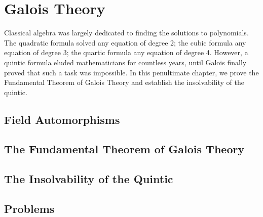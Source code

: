 \chapter{Galois Theory}
Classical algebra was largely dedicated to finding the solutions to polynomials. The quadratic formula solved any equation of degree 2; the cubic formula any equation of degree 3; the quartic formula any equation of degree 4. However, a quintic formula eluded mathematicians for countless years, until Galois finally proved that such a task was impossible. In this penultimate chapter, we prove the Fundamental Theorem of Galois Theory and establish the insolvability of the quintic.

\section{Field Automorphisms}

\section{The Fundamental Theorem of Galois Theory}

\section{The Insolvability of the Quintic}

\newpage

\section{Problems}
